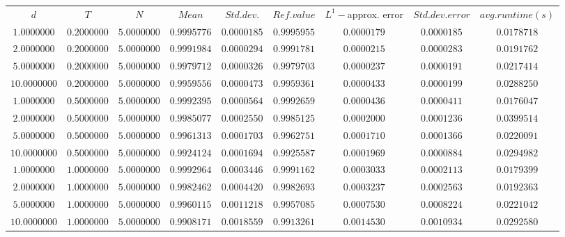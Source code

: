 \begin{tabular}{ccccccccc}
$d$ & $T$ & $N$ & $Mean$ & $Std. dev.$ & $Ref. value$ & $L^1-$approx. error & $Std. dev. error$ & $avg. runtime (s)$\\
$1.0000000$ & $0.2000000$ & $5.0000000$ & $0.9995776$ & $0.0000185$ & $0.9995955$ & $0.0000179$ & $0.0000185$ & $0.0178718$\\
$2.0000000$ & $0.2000000$ & $5.0000000$ & $0.9991984$ & $0.0000294$ & $0.9991781$ & $0.0000215$ & $0.0000283$ & $0.0191762$\\
$5.0000000$ & $0.2000000$ & $5.0000000$ & $0.9979712$ & $0.0000326$ & $0.9979703$ & $0.0000237$ & $0.0000191$ & $0.0217414$\\
$10.0000000$ & $0.2000000$ & $5.0000000$ & $0.9959556$ & $0.0000473$ & $0.9959361$ & $0.0000433$ & $0.0000199$ & $0.0288250$\\
$1.0000000$ & $0.5000000$ & $5.0000000$ & $0.9992395$ & $0.0000564$ & $0.9992659$ & $0.0000436$ & $0.0000411$ & $0.0176047$\\
$2.0000000$ & $0.5000000$ & $5.0000000$ & $0.9985077$ & $0.0002550$ & $0.9985125$ & $0.0002000$ & $0.0001236$ & $0.0399514$\\
$5.0000000$ & $0.5000000$ & $5.0000000$ & $0.9961313$ & $0.0001703$ & $0.9962751$ & $0.0001710$ & $0.0001366$ & $0.0220091$\\
$10.0000000$ & $0.5000000$ & $5.0000000$ & $0.9924124$ & $0.0001694$ & $0.9925587$ & $0.0001969$ & $0.0000884$ & $0.0294982$\\
$1.0000000$ & $1.0000000$ & $5.0000000$ & $0.9992964$ & $0.0003446$ & $0.9991162$ & $0.0003033$ & $0.0002113$ & $0.0179399$\\
$2.0000000$ & $1.0000000$ & $5.0000000$ & $0.9982462$ & $0.0004420$ & $0.9982693$ & $0.0003237$ & $0.0002563$ & $0.0192363$\\
$5.0000000$ & $1.0000000$ & $5.0000000$ & $0.9960115$ & $0.0011218$ & $0.9957085$ & $0.0007530$ & $0.0008224$ & $0.0221042$\\
$10.0000000$ & $1.0000000$ & $5.0000000$ & $0.9908171$ & $0.0018559$ & $0.9913261$ & $0.0014530$ & $0.0010934$ & $0.0292580$\\
\end{tabular}
